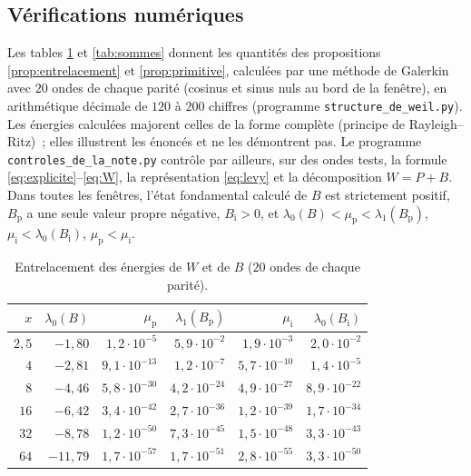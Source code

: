 \documentclass[11pt,a4paper]{article}
\theoremstyle{definition}
\theoremstyle{remark}
\begin{document}
\subsection*{Vérifications numériques}
Les tables \ref{tab:niveaux} et \ref{tab:sommes} donnent les quantités des propositions \ref{prop:entrelacement} et
\ref{prop:primitive}, calculées par une méthode de Galerkin avec $20$ ondes de chaque parité (cosinus et sinus nuls au bord de
la fenêtre), en arithmétique décimale de $120$ à $200$ chiffres (programme \texttt{structure\_de\_weil.py}). Les énergies
calculées majorent celles de la forme complète (principe de Rayleigh--Ritz)~; elles illustrent les énoncés et ne les démontrent pas. Le programme \texttt{controles\_de\_la\_note.py} contrôle par ailleurs, sur des ondes tests, la formule \eqref{eq:explicite}--\eqref{eq:W}, la représentation \eqref{eq:levy} et la décomposition $W=P+B$.
Dans toutes les fenêtres, l'état fondamental calculé de $B$ est strictement positif, $B_{\mathrm p}$ a une seule valeur
propre négative, $B_{\mathrm i}>0$, et $\lambda_0(B)<\mu_{\mathrm p}<\lambda_1(B_{\mathrm p})$, $\mu_{\mathrm i}<\lambda_0(B_{\mathrm i})$,
$\mu_{\mathrm p}<\mu_{\mathrm i}$.

\begin{table}[ht]\centering\small
\begin{tabular}{rrrrrr}\toprule
$x$ & $\lambda_0(B)$ & $\mu_{\mathrm p}$ & $\lambda_1(B_{\mathrm p})$ & $\mu_{\mathrm i}$ & $\lambda_0(B_{\mathrm i})$\\\midrule
$2{,}5$ & $-1{,}80$ & $1{,}2\cdot 10^{-5}$ & $5{,}9\cdot 10^{-2}$ & $1{,}9\cdot 10^{-3}$ & $2{,}0\cdot 10^{-2}$ \\
$4$ & $-2{,}81$ & $9{,}1\cdot 10^{-13}$ & $1{,}2\cdot 10^{-7}$ & $5{,}7\cdot 10^{-10}$ & $1{,}4\cdot 10^{-5}$ \\
$8$ & $-4{,}46$ & $5{,}8\cdot 10^{-30}$ & $4{,}2\cdot 10^{-24}$ & $4{,}9\cdot 10^{-27}$ & $8{,}9\cdot 10^{-22}$ \\
$16$ & $-6{,}42$ & $3{,}4\cdot 10^{-42}$ & $2{,}7\cdot 10^{-36}$ & $1{,}2\cdot 10^{-39}$ & $1{,}7\cdot 10^{-34}$ \\
$32$ & $-8{,}78$ & $1{,}2\cdot 10^{-50}$ & $7{,}3\cdot 10^{-45}$ & $1{,}5\cdot 10^{-48}$ & $3{,}3\cdot 10^{-43}$ \\
$64$ & $-11{,}79$ & $1{,}7\cdot 10^{-57}$ & $1{,}7\cdot 10^{-51}$ & $2{,}8\cdot 10^{-55}$ & $3{,}3\cdot 10^{-50}$ \\\bottomrule
\end{tabular}
\caption{Entrelacement des énergies de $W$ et de $B$ ($20$ ondes de chaque parité).}\label{tab:niveaux}
\end{table}
\end{document}
